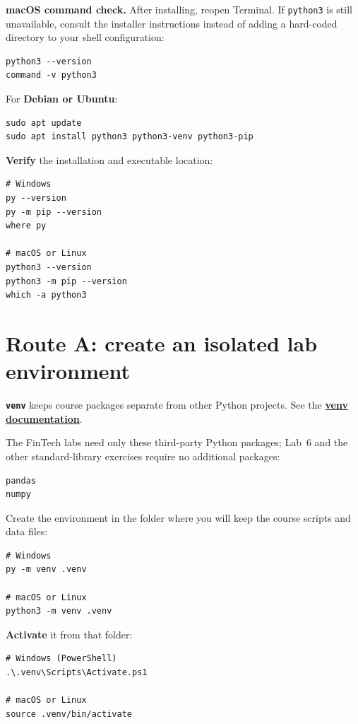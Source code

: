 \textbf{macOS command check.} After installing, reopen Terminal. If
\texttt{python3} is still unavailable, consult the installer instructions
instead of adding a hard-coded directory to your shell configuration:

\begin{lstlisting}[style=utpterminal]
python3 --version
command -v python3
\end{lstlisting}

For \textbf{Debian or Ubuntu}:

\begin{lstlisting}[style=utpterminal]
sudo apt update
sudo apt install python3 python3-venv python3-pip
\end{lstlisting}

\textbf{Verify} the installation and executable location:

\begin{lstlisting}[style=utpterminal]
# Windows
py --version
py -m pip --version
where py

# macOS or Linux
python3 --version
python3 -m pip --version
which -a python3
\end{lstlisting}

\section{Route A: create an isolated lab environment}

\textbf{\texttt{venv}} keeps course packages separate from other Python
projects. See the \href{https://docs.python.org/3/library/venv.html}{\textbf{venv documentation}}.

The FinTech labs need only these third-party Python packages; Lab~6 and the
other standard-library exercises require no additional packages:

\begin{lstlisting}[style=utpterminal]
pandas
numpy
\end{lstlisting}

Create the environment in the folder where you will keep the course scripts
and data files:

\begin{lstlisting}[style=utpterminal]
# Windows
py -m venv .venv

# macOS or Linux
python3 -m venv .venv
\end{lstlisting}

\textbf{Activate} it from that folder:

\begin{lstlisting}[style=utpterminal]
# Windows (PowerShell)
.\.venv\Scripts\Activate.ps1

# macOS or Linux
source .venv/bin/activate
\end{lstlisting}

